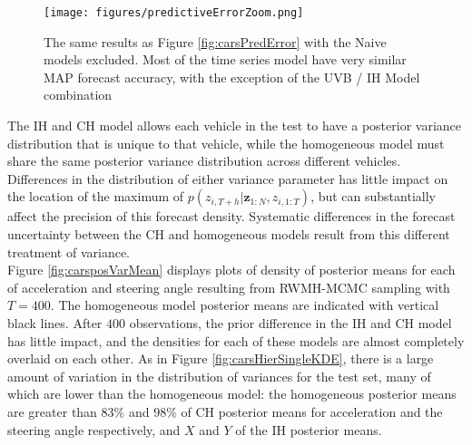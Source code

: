 \documentclass[
12pt, %
onehalfspacing, %
nohyperref, %
headsepline, %
chapterinoneline, %
]{MastersDoctoralThesis} %
\begin{document}
\begin{figure}[htbp]
\centering
\texttt{[image: figures/predictiveErrorZoom.png]}
\caption{The same results as Figure \ref{fig:carsPredError} with the Naive models excluded. Most of the time series model have very similar MAP forecast accuracy, with the exception of the UVB / IH Model combination}
\label{fig:carsPredErrorZ}
\end{figure}

\begin{table}[htbp]
\centering
{}
\caption{Mean forecast Euclidean error in metres for the the best Naive model, Naive 8, and each time series model at a forecast horizon of one second, two seconds and three seconds. Each time series model performs significantly better than Naive 8, and are very competitive with each other. The use of UVB for the IH model appears to have increased the forecast error relative to MCMC and SVB inference for this model.}
\label{table:carsError}
\end{table}

The IH and CH model allows each vehicle in the test to have a posterior variance distribution that is unique to that vehicle, while the homogeneous model must share the same posterior variance distribution across different vehicles. Differences in the distribution of either variance parameter has little impact on the location of the maximum of $p(z_{i, T+h} | \textbf{z}_{1:N}, z_{i, 1:T})$, but can substantially affect the precision of this forecast density. Systematic differences in the forecast uncertainty between the CH and homogeneous models result from this different treatment of variance.
\\

Figure \ref{fig:carsposVarMean} displays plots of density of posterior means for each of acceleration and steering angle resulting from RWMH-MCMC sampling with $T = 400$. The homogeneous model posterior means are indicated with vertical black lines. After $400$ observations, the prior difference in the IH and CH model has little impact, and the densities for each of these models are almost completely overlaid on each other. As in Figure \ref{fig:carsHierSingleKDE}, there is a large amount of variation in the distribution of variances for the test set, many of which are lower than the homogeneous model: the homogeneous posterior means are greater than $83\%$ and $98\%$ of CH posterior means for acceleration and the steering angle respectively, and $X$ and $Y$ of the IH posterior means.
\\
\end{document}
